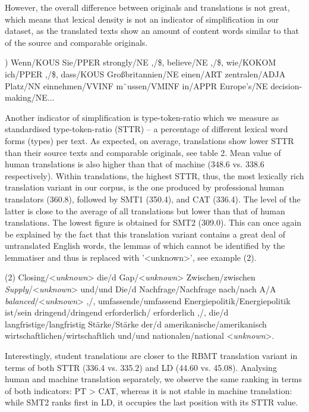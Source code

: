 \documentclass[output=paper]{LSP/langsci}
\begin{document}
However, the overall difference between originals and translations is not great, which means that lexical density is not an indicator of simplification in our dataset, as the translated texts show an amount of content words similar to that of the source and comparable originals.\newline

) Wenn/KOUS Sie/PPER strongly/NE ,/\$, believe/NE ,/\$, wie/KOKOM ich/PPER ,/\$, dass/KOUS Großbritannien/NE einen/ART zentralen/ADJA Platz/NN einnehmen/VVINF m¨ussen/VMINF in/APPR Europe’s/NE decision-making/NE...\newline

Another indicator of simpliﬁcation is type-token-ratio which we measure as standardised type-token-ratio (STTR) – a percentage of different lexical word forms (types) per text.  As expected, on average, translations show lower STTR than their source texts and comparable originals, see table 2. Mean value of human translations is also higher than that of machine (348.6 vs. 338.6 respectively). Within translations, the highest STTR, thus, the most lexically rich translation variant in our corpus, is the one produced by professional human translators (360.8), followed by SMT1 (350.4), and CAT (336.4).  The level of the latter is close to the average of all translations but lower than that of human translations. The lowest figure is obtained for SMT2 (309.0). This can once again be explained by the fact that this translation variant contains a great deal of untranslated English words, the lemmas of which cannot be identified by the lemmatiser and thus is replaced with '<unknown>’, see example (2).\newline

\noindent (2) \newline
\noindent Closing/<\textit{unknown}> die/d Gap/<\textit{unknown}> Zwischen/zwischen \textit{Supply}/<\textit{unknown}> und/und Die/d Nachfrage/Nachfrage nach/nach A/A \textit{balanced}/<\textit{unknown}> ,/, umfassende/umfassend Energiepolitik/Energiepolitik ist/sein dringend/dringend erforderlich/  erforderlich ,/, die/d langfristige/langfristig Stärke/Stärke der/d  amerikanische/amerikanisch wirtschaftlichen/wirtschaftlich und/und nationalen/national <\textit{unknown}>.\newline

Interestingly, student translations are closer to the RBMT translation variant in terms of both STTR (336.4 vs. 335.2) and LD (44.60 vs. 45.08). Analysing human and machine translation separately, we observe the same ranking in terms of both indicators: PT > CAT, whereas it is not stable in machine translation: while SMT2 ranks first in LD, it occupies the last position with its STTR value.
\end{document}
